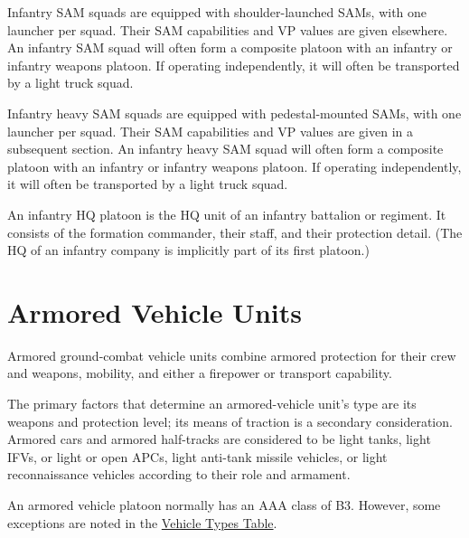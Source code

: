 \begin{withcounters}

    Infantry SAM squads are equipped with shoulder-launched SAMs, with one launcher per squad. Their SAM capabilities and VP values are given elsewhere.
    An infantry SAM squad will often form a composite platoon with an infantry or infantry weapons platoon.
    If operating independently, it will often be transported by a light truck squad.


    Infantry heavy SAM squads are equipped with pedestal-mounted SAMs, with one launcher per squad. Their SAM capabilities and VP values are given in a subsequent section.
    An infantry heavy SAM squad will often form a composite platoon with an infantry or infantry weapons platoon. If operating independently, it will often be transported by a light truck squad.


    An infantry HQ platoon is the HQ unit of an infantry battalion or regiment. It consists of the formation commander, their staff, and their protection detail.
    (The HQ of an infantry company is implicitly part of its first platoon.)%

\end{withcounters}

\section{Armored Vehicle Units}

Armored ground-combat vehicle units combine armored protection for their crew and weapons, mobility, and either a firepower or transport capability.

The primary factors that determine an armored-vehicle unit's type are its weapons and protection level; its means of traction is a secondary consideration. Armored cars and armored half-tracks are considered to be light tanks, light IFVs, or light or open APCs, light anti-tank missile vehicles, or light reconnaissance vehicles according to their role and armament.

An armored vehicle platoon normally has an AAA class of B3. However, some exceptions are noted in the \hyperlink{table:vehicle-types}{Vehicle Types Table}.

